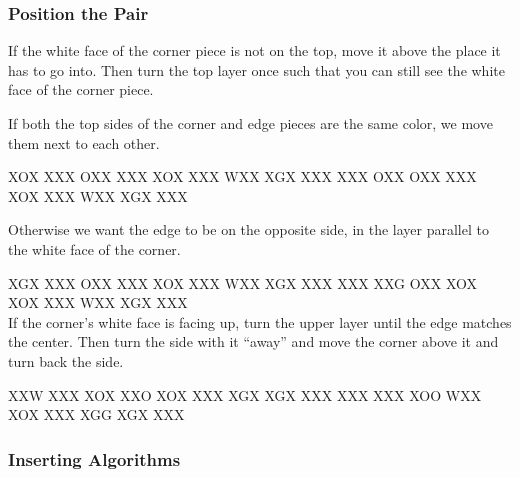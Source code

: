 \documentclass[9pt,dvipsnames]{extarticle}
\begin{document}
\begin{multicols*}{4}
\subsubsection*{Position the Pair}

If the white face of the corner piece is not on the top, move it above the place
it has to go into. Then turn the top layer once such that you can still see the
white face of the corner piece.

If both the top sides of the corner and edge pieces are the same color, we move
them next to each other.

\RubikFaceUp
{X}{O}{X}
{X}{X}{X}
{O}{X}{X}%
\RubikFaceRight
{X}{X}{X}
{X}{O}{X}
{X}{X}{X}%
\RubikFaceFront
{W}{X}{X}
{X}{G}{X}
{X}{X}{X}%
\ShowCube{\cubesize}{\cubescale}{\DrawRubikCubeRU}%
\RubikRotation{\fourspot}%
%
\RubikFaceUp
{X}{X}{X}
{O}{X}{X}
{O}{X}{X}%
\RubikFaceRight
{X}{X}{X}
{X}{O}{X}
{X}{X}{X}%
\RubikFaceFront
{W}{X}{X}
{X}{G}{X}
{X}{X}{X}%
\ShowCube{\cubesize}{\cubescale}{\DrawRubikCubeRU}

Otherwise we want the edge to be on the opposite side, in the layer parallel to
the white face of the corner.

\RubikFaceUp
{X}{G}{X}
{X}{X}{X}
{O}{X}{X}%
\RubikFaceRight
{X}{X}{X}
{X}{O}{X}
{X}{X}{X}%
\RubikFaceFront
{W}{X}{X}
{X}{G}{X}
{X}{X}{X}%
\ShowCube{\cubesize}{\cubescale}{\DrawRubikCubeRU}%
\RubikRotation{\fourspot}%
%
\RubikFaceUp
{X}{X}{X}
{X}{X}{G}
{O}{X}{X}%
\RubikFaceRight
{X}{O}{X}
{X}{O}{X}
{X}{X}{X}%
\RubikFaceFront
{W}{X}{X}
{X}{G}{X}
{X}{X}{X}%
\ShowCube{\cubesize}{\cubescale}{\DrawRubikCubeRU}\\[.3cm]

If the corner's white face is facing up, turn the upper layer until the edge
matches the center. Then turn the side with it ``away'' and move
the corner above it and turn back the side.

\RubikFaceUp
{X}{X}{W}
{X}{X}{X}
{X}{O}{X}%
\RubikFaceRight
{X}{X}{O}
{X}{O}{X}
{X}{X}{X}%
\RubikFaceFront
{X}{G}{X}
{X}{G}{X}
{X}{X}{X}%
\ShowCube{\cubesize}{\cubescale}{\DrawRubikCubeRU}%
\RubikRotation{\fourspot}%
%
\RubikUU%
%
\RubikFaceUp
{X}{X}{X}
{X}{X}{X}
{X}{O}{O}%
\RubikFaceRight
{W}{X}{X}
{X}{O}{X}
{X}{X}{X}%
\RubikFaceFront
{X}{G}{G}
{X}{G}{X}
{X}{X}{X}%
\ShowCube{\cubesize}{\cubescale}{\DrawRubikCubeRU}

\subsubsection*{Inserting Algorithms}


\end{multicols*}
\end{document}
